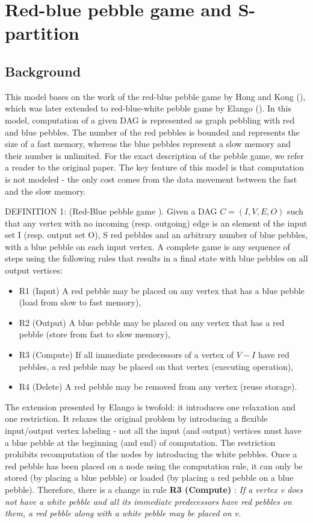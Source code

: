 \documentclass[sigconf]{acmart}
\begin{document}
	\section{Red-blue pebble game and S-partition}
	\subsection{Background}
	\label{sec:background}
	This model bases on the work of the red-blue pebble game by Hong and Kong 
	(\cite{redblue}), which was later extended to red-blue-white pebble game by 
	Elango (\cite{redbluewhite}). In this model, computation of a given DAG is 
	represented as graph 
	pebbling with red and blue pebbles. The number of the red pebbles is 
	bounded and represents the size of a fast memory, whereas the blue pebbles 
	represent a slow memory and their number is unlimited. For the exact 
	description of the pebble game, we refer a reader to the original paper. 
	The key feature of this model is that computation is not modeled - the only 
	cost comes from the data movement between the fast and the slow memory. 
	
	DEFINITION 1: (Red-Blue pebble game \cite{redblue}).
	Given a DAG $C = (I,V,E,O)$
	such that any vertex with no incoming (resp.
	outgoing) edge is an element of the input set I (resp. output set O), S red 
	pebbles and
	an arbitrary number of blue pebbles, with a blue pebble on
	each input vertex. A complete game is any sequence of steps
	using the following rules that results in a final state with blue
	pebbles on all output vertices:
	\begin{itemize}
		\item R1 (Input)
		A red pebble may be placed on any vertex that has
		a blue pebble (load from slow to fast memory),
		\item R2 (Output)
		A blue pebble may be placed on any vertex that
		has a red pebble (store from fast to slow memory),
		\item R3 (Compute)
		If all immediate predecessors of a vertex of
		$V - I$ have red pebbles, a red pebble may be placed on that
		vertex (executing operation),
		\item R4 (Delete)
		A red pebble may be removed from any vertex
		(reuse storage).
	\end{itemize}
	
	
	The extension presented by Elango is twofold: it introduces one relaxation 
	and one restriction. It relaxes the original problem by introducing a 
	flexible input/output vertex labeling - not all the input (and output) 
	vertices must have a blue pebble at the beginning (and end) of computation.
	The restriction prohibits recomputation of the nodes by introducing the 
	white pebbles. Once a red pebble has been placed on a node using the 
	computation rule, it can only be stored (by placing a blue pebble) or 
	loaded (by placing a red pebble on a blue pebble). Therefore, there is a 
	change in rule \textbf{R3 (Compute)} : \textit{If a vertex v does not have 
		a white pebble and
		all its immediate predecessors have red pebbles on them, a
		red pebble along with a white pebble may be placed on v.}
	
\end{document}
